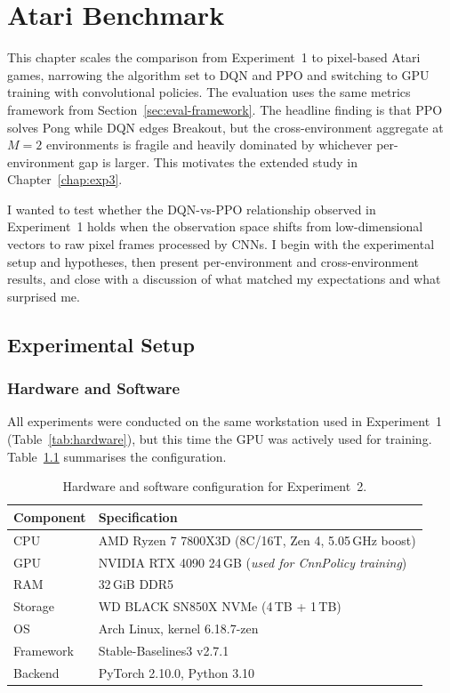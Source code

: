 

\chapter[EXP2: Atari Benchmark]{Atari Benchmark}
\label{chap:exp2}

This chapter scales the comparison from Experiment~1 to pixel-based Atari games, narrowing the algorithm set to DQN and PPO and switching to GPU training with convolutional policies. The evaluation uses the same metrics framework from Section~\ref{sec:eval-framework}. The headline finding is that PPO solves Pong while DQN edges Breakout, but the cross-environment aggregate at $M=2$ environments is fragile and heavily dominated by whichever per-environment gap is larger. This motivates the extended study in Chapter~\ref{chap:exp3}.

I wanted to test whether the DQN-vs-PPO relationship observed in
Experiment~1 holds when the observation space shifts from
low-dimensional vectors to raw pixel frames processed by CNNs.
I begin with the experimental setup and hypotheses, then present
per-environment and cross-environment results, and close with a
discussion of what matched my expectations and what surprised me.

\section{Experimental Setup}
\label{sec:atari-setup}

\subsection{Hardware and Software}
\label{sec:atari-hardware}

All experiments were conducted on the same workstation used in
Experiment~1 (Table~\ref{tab:hardware}), but this time the GPU was
actively used for training. Table~\ref{tab:atari-hardware} summarises
the configuration.

\begin{table}[htbp!]
\centering
\caption[EXP2: Hardware configuration]{Hardware and software configuration for Experiment~2.}
\label{tab:atari-hardware}
\begin{tabular}{ll}
\toprule
\textbf{Component}   & \textbf{Specification} \\
\midrule
CPU         & AMD Ryzen 7 7800X3D (8C/16T, Zen 4, 5.05\,GHz boost) \\
GPU         & NVIDIA RTX 4090 24\,GB (\emph{used for CnnPolicy training}) \\
RAM         & 32\,GiB DDR5 \\
Storage     & WD BLACK SN850X NVMe (4\,TB + 1\,TB) \\
OS          & Arch Linux, kernel 6.18.7-zen \\
Framework   & Stable-Baselines3 v2.7.1 \citep{raffin2021sb3} \\
Backend     & PyTorch 2.10.0, Python 3.10 \\
\bottomrule
\end{tabular}
\end{table}

